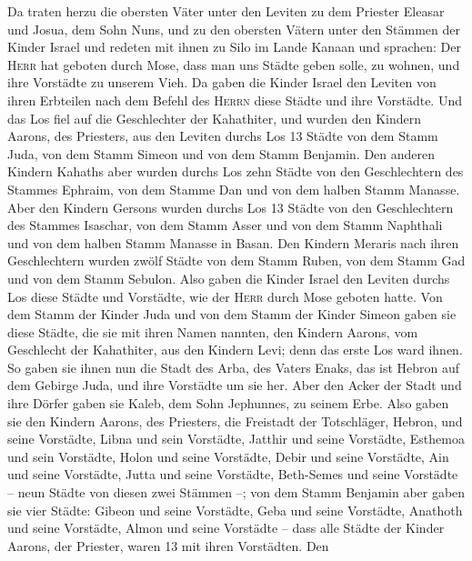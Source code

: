 Da traten herzu die obersten Väter unter den Leviten zu
dem Priester Eleasar und Josua, dem Sohn Nuns, und zu den obersten
Vätern unter den Stämmen der Kinder Israel  und redeten
mit ihnen zu Silo im Lande Kanaan und sprachen: Der \textsc{Herr} hat
geboten durch Mose, dass man uns Städte geben solle, zu wohnen, und ihre
Vorstädte zu unserem Vieh.  Da gaben die Kinder Israel den
Leviten von ihren Erbteilen nach dem Befehl des \textsc{Herrn} diese
Städte und ihre Vorstädte.  Und das Los fiel auf die
Geschlechter der Kahathiter, und wurden den Kindern Aarons, des
Priesters, aus den Leviten durchs Los 13 Städte von dem Stamm Juda, von
dem Stamm Simeon und von dem Stamm Benjamin.  Den anderen
Kindern Kahaths aber wurden durchs Los zehn Städte von den Geschlechtern
des Stammes Ephraim, von dem Stamme Dan und von dem halben Stamm
Manasse.  Aber den Kindern Gersons wurden durchs Los 13
Städte von den Geschlechtern des Stammes Isaschar, von dem Stamm Asser
und von dem Stamm Naphthali und von dem halben Stamm Manasse in Basan.
 Den Kindern Meraris nach ihren Geschlechtern wurden zwölf
Städte von dem Stamm Ruben, von dem Stamm Gad und von dem Stamm Sebulon.
 Also gaben die Kinder Israel den Leviten durchs Los diese
Städte und Vorstädte, wie der \textsc{Herr} durch Mose geboten hatte.
 Von dem Stamm der Kinder Juda und von dem Stamm der
Kinder Simeon gaben sie diese Städte, die sie mit ihren Namen nannten,
 den Kindern Aarons, vom Geschlecht der Kahathiter, aus
den Kindern Levi; denn das erste Los ward ihnen.  So
gaben sie ihnen nun die Stadt des Arba, des Vaters Enaks, das ist Hebron
auf dem Gebirge Juda, und ihre Vorstädte um sie her. 
Aber den Acker der Stadt und ihre Dörfer gaben sie Kaleb, dem Sohn
Jephunnes, zu seinem Erbe.  Also gaben sie den Kindern
Aarons, des Priesters, die Freistadt der Totschläger, Hebron, und seine
Vorstädte, Libna und sein Vorstädte,  Jatthir und seine
Vorstädte, Esthemoa und sein Vorstädte,  Holon und seine
Vorstädte, Debir und seine Vorstädte,  Ain und seine
Vorstädte, Jutta und seine Vorstädte, Beth-Semes und seine Vorstädte --
neun Städte von diesen zwei Stämmen --;  von dem Stamm
Benjamin aber gaben sie vier Städte: Gibeon und seine Vorstädte, Geba
und seine Vorstädte,  Anathoth und seine Vorstädte, Almon
und seine Vorstädte --  dass alle Städte der Kinder
Aarons, der Priester, waren 13 mit ihren Vorstädten.  Den

